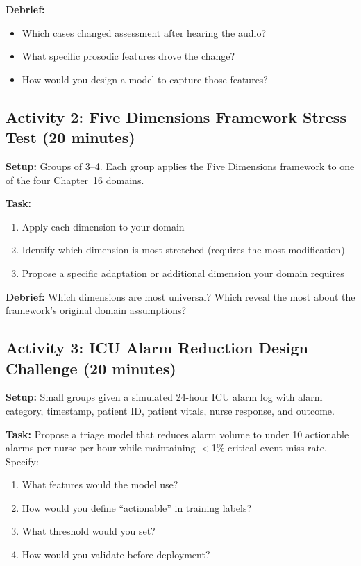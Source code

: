 \textbf{Debrief:}
\begin{itemize}
    \item Which cases changed assessment after hearing the audio?
    \item What specific prosodic features drove the change?
    \item How would you design a model to capture those features?
\end{itemize}

\subsection{Activity 2: Five Dimensions Framework Stress Test (20 minutes)}

\textbf{Setup:} Groups of 3--4. Each group applies the Five Dimensions framework to one of the four Chapter~16 domains.

\textbf{Task:}
\begin{enumerate}
    \item Apply each dimension to your domain
    \item Identify which dimension is most stretched (requires the most modification)
    \item Propose a specific adaptation or additional dimension your domain requires
\end{enumerate}

\textbf{Debrief:} Which dimensions are most universal? Which reveal the most about the framework's original domain assumptions?

\subsection{Activity 3: ICU Alarm Reduction Design Challenge (20 minutes)}

\textbf{Setup:} Small groups given a simulated 24-hour ICU alarm log with alarm category, timestamp, patient ID, patient vitals, nurse response, and outcome.

\textbf{Task:} Propose a triage model that reduces alarm volume to under 10 actionable alarms per nurse per hour while maintaining $<$1\% critical event miss rate. Specify:
\begin{enumerate}
    \item What features would the model use?
    \item How would you define ``actionable'' in training labels?
    \item What threshold would you set?
    \item How would you validate before deployment?
\end{enumerate}


